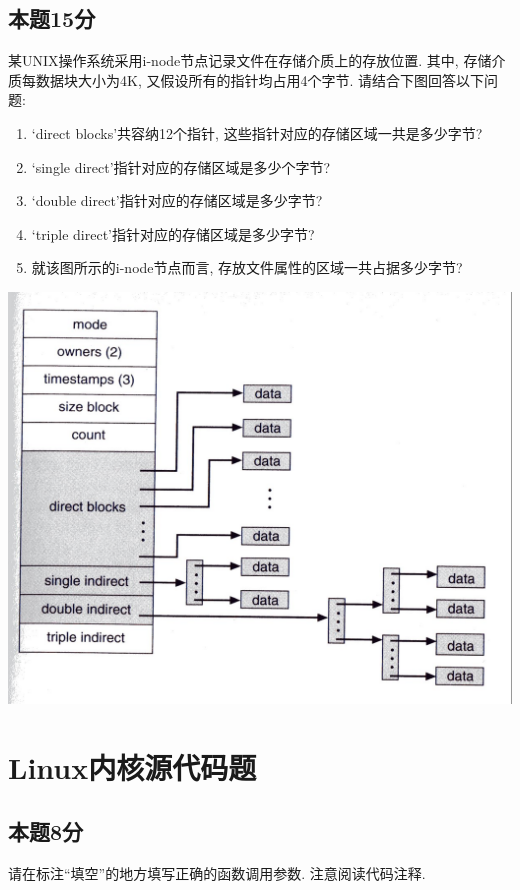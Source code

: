 \documentclass[a4paper,11pt]{article}
\begin{document}
\begin{CJK*}{UTF8}{gbsn}
\subsection{本题15分}
某UNIX操作系统采用i-node节点记录文件在存储介质上的存放位置. 其中, 存储介质每数据块大小为4K, 又假设所有的指针均占用4个字节.
请结合下图回答以下问题:
\begin{enumerate}
\item `direct blocks'共容纳12个指针, 这些指针对应的存储区域一共是多少字节?
\item `single direct'指针对应的存储区域是多少个字节?
\item `double direct'指针对应的存储区域是多少字节?
\item `triple direct'指针对应的存储区域是多少字节?
\item 就该图所示的i-node节点而言, 存放文件属性的区域一共占据多少字节?
\end{enumerate}
 
\includegraphics{inode-detail.jpg}
\\[2in]

\newpage
\section{Linux内核源代码题}
\subsection{本题8分}
请在标注``填空''的地方填写正确的函数调用参数. 注意阅读代码注释.


\end{CJK*}
\end{document}
